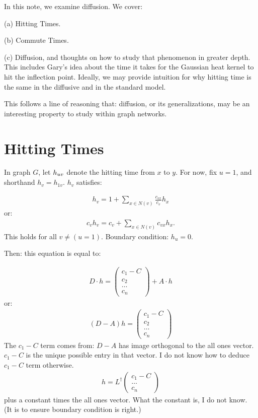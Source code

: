 
In this note, we examine diffusion. We cover:

(a) Hitting Times.

(b) Commute Times.

(c) Diffusion, and thoughts on how to study that phenomenon in greater
depth. This includes Gary's idea about the time it takes for the
Gaussian heat kernel to hit the inflection point. Ideally, we may
provide intuition for why hitting time is the same in the diffusive and
in the standard model.

This follows a line of reasoning that: diffusion, or its
generalizations, may be an interesting
property to study within graph networks. 
\section{Hitting Times}
In graph $G$, let $h_{uv}$ denote the hitting time from $x$ to $y$. For
now, fix $u=1$, and shorthand $h_v= h_{1v}$. $h_v$ satisfies:

\begin{align}
  h_v = 1 + \sum_{x \in N(v)} \frac{c_{vx}}{c_v} h_x 
\end{align}
or:
\begin{align}
  c_v h_v = c_v + \sum_{x \in N(v)} c_{vx} h_x.
\end{align}
This holds for all $v \not= (u=1)$. Boundary condition: $h_u = 0$.

Then: this equation is equal to:

\begin{align}
  D \cdot h = \begin{pmatrix} c_1-C \\ c_2 \\ \ldots \\ c_n   \end{pmatrix}
    + A \cdot h
\end{align}
or:
\begin{align}
  (D - A)h = \begin{pmatrix}c_1 - C \\ c_2 \\ \ldots \\ c_n
  \end{pmatrix}
\end{align}
The $c_1-C$ term comes from: $D-A$ has image orthogonal to the all ones
vector. $c_1-C$ is the unique possible entry in that vector. I do not
know how to deduce $c_1-C$ term otherwise. 
\begin{align}
  h = L^\dag \begin{pmatrix} c_1 - C \\ \ldots \\ c_n \end{pmatrix}
\end{align}
plus a constant times the all ones vector. What the constant is, I do
not know. (It is to ensure boundary condition is right.)
